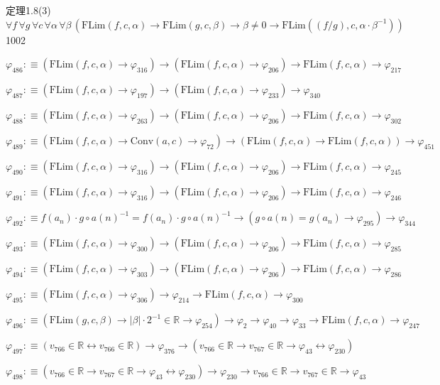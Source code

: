 \begin{fullproof}{定理1.8(3)}{$\forall f\,\forall g\,\forall c\,\forall \alpha\,\forall \beta\,(\mathrm{FLim}(f,c,\alpha) \to \mathrm{FLim}(g,c,\beta) \to \beta \neq 0 \to \mathrm{FLim}((f / g),c,\alpha \cdot \beta^{-1}))$}{1002}
\begin{abbrevlist}
\item $\varphi_{486} :\equiv (\mathrm{FLim}(f,c,\alpha) \to \varphi_{316}) \to (\mathrm{FLim}(f,c,\alpha) \to \varphi_{206}) \to \mathrm{FLim}(f,c,\alpha) \to \varphi_{217}$
\item $\varphi_{487} :\equiv (\mathrm{FLim}(f,c,\alpha) \to \varphi_{197}) \to (\mathrm{FLim}(f,c,\alpha) \to \varphi_{233}) \to \varphi_{340}$
\item $\varphi_{488} :\equiv (\mathrm{FLim}(f,c,\alpha) \to \varphi_{263}) \to (\mathrm{FLim}(f,c,\alpha) \to \varphi_{206}) \to \mathrm{FLim}(f,c,\alpha) \to \varphi_{302}$
\item $\varphi_{489} :\equiv (\mathrm{FLim}(f,c,\alpha) \to \mathrm{Conv}(a,c) \to \varphi_{72}) \to (\mathrm{FLim}(f,c,\alpha) \to \mathrm{FLim}(f,c,\alpha)) \to \varphi_{451}$
\item $\varphi_{490} :\equiv (\mathrm{FLim}(f,c,\alpha) \to \varphi_{316}) \to (\mathrm{FLim}(f,c,\alpha) \to \varphi_{206}) \to \mathrm{FLim}(f,c,\alpha) \to \varphi_{245}$
\item $\varphi_{491} :\equiv (\mathrm{FLim}(f,c,\alpha) \to \varphi_{316}) \to (\mathrm{FLim}(f,c,\alpha) \to \varphi_{206}) \to \mathrm{FLim}(f,c,\alpha) \to \varphi_{246}$
\item $\varphi_{492} :\equiv f(a_{n}) \cdot g \circ a(n)^{-1} = f(a_{n}) \cdot g \circ a(n)^{-1} \to (g \circ a(n) = g(a_{n}) \to \varphi_{295}) \to \varphi_{344}$
\item $\varphi_{493} :\equiv (\mathrm{FLim}(f,c,\alpha) \to \varphi_{300}) \to (\mathrm{FLim}(f,c,\alpha) \to \varphi_{206}) \to \mathrm{FLim}(f,c,\alpha) \to \varphi_{285}$
\item $\varphi_{494} :\equiv (\mathrm{FLim}(f,c,\alpha) \to \varphi_{303}) \to (\mathrm{FLim}(f,c,\alpha) \to \varphi_{206}) \to \mathrm{FLim}(f,c,\alpha) \to \varphi_{286}$
\item $\varphi_{495} :\equiv (\mathrm{FLim}(f,c,\alpha) \to \varphi_{306}) \to \varphi_{214} \to \mathrm{FLim}(f,c,\alpha) \to \varphi_{300}$
\item $\varphi_{496} :\equiv (\mathrm{FLim}(g,c,\beta) \to \lvert \beta \rvert \cdot 2^{-1} \in \mathbb{R} \to \varphi_{254}) \to \varphi_{2} \to \varphi_{40} \to \varphi_{33} \to \mathrm{FLim}(f,c,\alpha) \to \varphi_{247}$
\item $\varphi_{497} :\equiv (v_{766} \in \mathbb{R} \leftrightarrow v_{766} \in \mathbb{R}) \to \varphi_{376} \to (v_{766} \in \mathbb{R} \to v_{767} \in \mathbb{R} \to \varphi_{43} \leftrightarrow \varphi_{230})$
\item $\varphi_{498} :\equiv (v_{766} \in \mathbb{R} \to v_{767} \in \mathbb{R} \to \varphi_{43} \leftrightarrow \varphi_{230}) \to \varphi_{230} \to v_{766} \in \mathbb{R} \to v_{767} \in \mathbb{R} \to \varphi_{43}$

\end{abbrevlist}
\end{fullproof}
